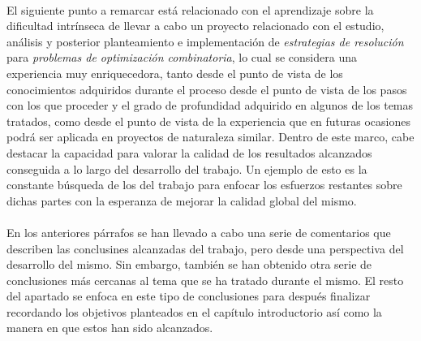 \documentclass{subfiles}
\begin{document}
      \paragraph{}
      El siguiente punto a remarcar está relacionado con el aprendizaje sobre la dificultad intrínseca de llevar a cabo un proyecto relacionado con el estudio, análisis y posterior planteamiento e implementación de \emph{estrategias de resolución} para \emph{problemas de optimización combinatoria}, lo cual se considera una experiencia muy enriquecedora, tanto desde el punto de vista de los conocimientos adquiridos durante el proceso desde el punto de vista de los pasos con los que proceder y el grado de profundidad adquirido en algunos de los temas tratados, como desde el punto de vista de la experiencia que en futuras ocasiones podrá ser aplicada en proyectos de naturaleza similar. Dentro de este marco, cabe destacar la capacidad para valorar la calidad de los resultados alcanzados conseguida a lo largo del desarrollo del trabajo. Un ejemplo de esto es la constante búsqueda de los  del trabajo para enfocar los esfuerzos restantes sobre dichas partes con la esperanza de mejorar la calidad global del mismo.

      \paragraph{}
      En los anteriores párrafos se han llevado a cabo una serie de comentarios que describen las conclusines alcanzadas del trabajo, pero desde una perspectiva del desarrollo del mismo. Sin embargo, también se han obtenido otra serie de conclusiones más cercanas al tema que se ha tratado durante el mismo. El resto del apartado se enfoca en este tipo de conclusiones para después finalizar recordando los objetivos planteados en el capítulo introductorio así como la manera en que estos han sido alcanzados.
\end{document}
